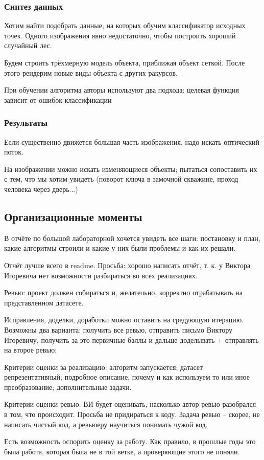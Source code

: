 \documentclass[main.tex]{subfiles}
\begin{document}
\subsubsection{ Синтез данных }

Хотим найти подобрать данные, на которых обучим классификатор исходных точек.
Одного изображения явно недостаточно, чтобы построить хороший случайный лес.

Будем строить трёхмерную модель объекта, приближая объект сеткой.
После этого рендерим новые виды объекта с других ракурсов.

При обучении алгоритма авторы используют два подхода: целевая функция зависит от ошибок классификации

\subsubsection{ Результаты }

Если существенно движется большая часть изображения, надо искать оптический поток.

На изображении можно искать изменяющиеся объекты; пытаться сопоставить их с тем, что мы хотим увидеть (поворот ключа в замочной скважине, проход человека через дверь...)

\subsection{ Организационные моменты }

В отчёте по большой лабораторной хочется увидеть все шаги: постановку и план, какие алгоритмы строили и какие у них были проблемы и как их решали.

Отчёт лучше всего в readme.
Просьба: хорошо написать отчёт, т. к. у Виктора Игоревича нет возможности разбираться во всех реализациях.

Ревью: проект должен собираться и, желательно, корректно отрабатывать на представленном датасете.

Исправления, доделки, доработки можно оставить на средующую итерацию.
Возможны два варианта: получить все ревью, отправить письмо Виктору Игоревичу, получить за это первичные баллы и дальше доделывать + отправлять на второе ревью;

Критерии оценки за реализацию: алгоритм запускается; датасет репрезентативный; подробное описание, почему и как используем то или иное преобразование; дополнительные задачи.

Критерии оценки ревью: ВИ будет оценивать, насколько автор ревью разобрался в том, что происходит.
Просьба не придираться к коду.
Задача ревью -- скорее, не написать чистый код, а ревьюеру научиться понимать чужой код.

Есть возможность оспорить оценку за работу.
Как правило, в прошлые годы это была работа, которая была не в той ветке, а проверяющие этого не поняли.
\end{document}
